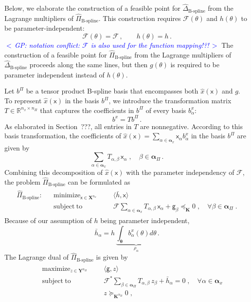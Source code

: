\documentclass{article}
\DeclareMathOperator*{\minimize}{minimize}
\DeclareMathOperator*{\maximize}{maximize}
\DeclareMathOperator*{\subj}{subject\;to}
\newcommand{\commentGP}[1]{\noindent \textcolor{blue}{\emph{$<\,$GP: #1$\,>$}}}%
\newcommand{\R}{\mathbb{R}}         %
\newcommand{\adj}{\ast}                     %
\newcommand{\ppar}{\theta}                          %
\newcommand{\Ppar}{{\bm{\theta}}}                   %
\newcommand{\X}{\mathbf{X}}                         %
\newcommand{\Y}{\mathbf{Y}}                         %
\newcommand{\K}{\mathbf{K}}                         %
\newcommand{\calF}{\mathcal{F}}                     %
\newcommand{\bx}{b^x}               %
\newcommand{\bxa}{\bx_\alpha}       %
\newcommand{\cx}{\textsf{x}}        %
\newcommand{\cxa}{\cx_\alpha}       %
\newcommand{\nx}{{n_x}}             %
\newcommand{\Alpha}{\bm{\alpha}}    %
\newcommand{\meanh}{\bar{h}}        %
\newcommand{\meanha}{\meanh_\alpha} %
\newcommand{\bPi}{b^\Pi}                %
\newcommand{\nPi}{{n_\Pi}}              %
\newcommand{\cg}{\textsf{g}}            %
\begin{document}
Below, we elaborate the construction of a feasible point for $\hat{\Delta}_{\text{B-spline}}$ from the Lagrange multipliers of $\hat{\Pi}_{\text{B-spline}}$. This construction requires $\calF(\ppar)$ and $h(\ppar)$ to be parameter-independent:
\[  \calF(\ppar) = \calF\,,\qquad h(\ppar) = h\,.
\]
\commentGP{notation conflict: $\calF$ is also used for the function mapping!?!} The construction of a feasible point for $\hat{\Pi}_{\text{B-spline}}$ from the Lagrange multipliers of $\hat{\Delta}_{\text{B-spline}}$ proceeds along the same lines, but then $g(\ppar)$ is required to be parameter independent instead of $h(\ppar)$.

Let $\bPi$ be a tensor product B-spline basis that encompasses both $\hat{x}(\cx)$ and $g$. To represent $\hat{x}(\cx)$ in the basis $\bPi$, we introduce the transformation matrix $T\in\R^{\nx\times\nPi}$ that captures the coefficients in $\bPi$ of every basis $\bxa$:
\[ \bx = T \bPi\,.
\]
As elaborated in Section~???, all entries in $T$ are nonnegative. According to this basis transformation, the coefficients of $\hat{x}(\cx) = \sum_{\alpha\in\Alpha_x}\cxa\bxa$ in the basis $\bPi$ are given by
\[  \sum_{\alpha\in\Alpha_x}\! T_{\alpha,\beta}\,\cx_\alpha\;, \quad \beta\in\Alpha_\Pi\,.%
\]
Combining this decomposition of $\hat{x}(\cx)$ with the parameter independency of $\calF$, the problem $\hat{\Pi}_\text{B-spline}$ can be formulated as
\begin{gather*}
\begin{aligned}
\hat{\Pi}_\text{B-spline}: && \minimize_{\cx\in\X^\nx} &&& \langle \meanh, \cx \rangle    \\%
                           && \subj                    &&& \calF \sum_{\alpha\in\Alpha_x}\! T_{\alpha,\beta}\,\cx_\alpha + \cg_\beta \preceq_\K 0 \;, \quad \forall \beta\in\Alpha_\Pi\;.%
\end{aligned}
\end{gather*}
Because of our assumption of $h$ being parameter independent,
\begin{equation}\label{eq:ass_h}
\meanha = h \, \underbrace{\int_\Ppar \bxa(\ppar)d\ppar}_{\rho_\alpha} \,.%
\end{equation}
The Lagrange dual of $\hat{\Pi}_\text{B-spline}$ is given by
\begin{gather}\label{eq:Bprog_primal2_dualized}
\begin{aligned}
 && \maximize_{z\in\Y^\nPi} &&& \langle \cg, z \rangle    \\%
 && \subj                   &&& \calF^\adj \sum_{\beta\in\Alpha_\Pi}\!T_{\alpha,\beta}\,z_\beta +  \meanha = 0 \;, \quad \forall \alpha\in \Alpha_x\\%
 &&                         &&& z \succeq_{\K^\nPi} 0 \;,%
\end{aligned}
\end{gather}
\end{document}
